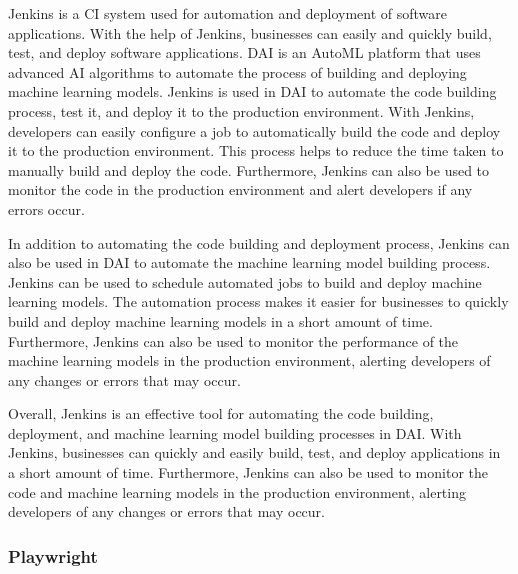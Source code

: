 \documentclass[12pt,a4paper]{report}
\begin{document}
Jenkins\cite{noauthor_jenkins_nodate} is a \ac{CI} system used for automation and deployment of software applications. With the help of Jenkins, businesses can easily and quickly build, test, and deploy software applications. \ac{DAI} is an \ac{AutoML} platform that uses advanced AI algorithms to automate the process of building and deploying machine learning models. Jenkins is used in \ac{DAI} to automate the code building process, test it, and deploy it to the production environment. With Jenkins, developers can easily configure a job to automatically build the code and deploy it to the production environment. This process helps to reduce the time taken to manually build and deploy the code. Furthermore, Jenkins can also be used to monitor the code in the production environment and alert developers if any errors occur.

In addition to automating the code building and deployment process, Jenkins can also be used in \ac{DAI} to automate the machine learning model building process. Jenkins can be used to schedule automated jobs to build and deploy machine learning models. The automation process makes it easier for businesses to quickly build and deploy machine learning models in a short amount of time. Furthermore, Jenkins can also be used to monitor the performance of the machine learning models in the production environment, alerting developers of any changes or errors that may occur.

Overall, Jenkins is an effective tool for automating the code building, deployment, and machine learning model building processes in \ac{DAI}. With Jenkins, businesses can quickly and easily build, test, and deploy applications in a short amount of time. Furthermore, Jenkins can also be used to monitor the code and machine learning models in the production environment, alerting developers of any changes or errors that may occur.

\subsubsection*{Playwright}
\end{document}

